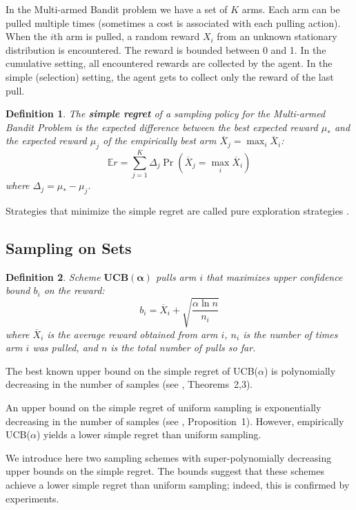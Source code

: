 \documentclass[letterpaper]{article}
\newcommand {\IE} {\ensuremath {\mathbb{E}}}
\newtheorem{dfn}{Definition}
\begin{document}
In the Multi-armed Bandit problem \cite{Vermorel.bandits} we have a set
of $K$ arms. Each arm can be pulled multiple times (sometimes a cost is
associated with each pulling action). When the $i$th arm
is pulled, a random reward $X_i$ from an unknown stationary
distribution is encountered.  The reward is bounded between 0 and 1.
In the cumulative setting, all encountered rewards are collected
by the agent. In the simple (selection) setting, the agent gets to
collect only the reward of the last pull.

\begin{dfn}
The \textbf{simple regret} of a sampling policy for the Multi-armed Bandit
Problem is the expected difference between the best expected reward
$\mu_*$ and the expected reward $\mu_j$ of the empirically best arm
$\overline X_j=\max_i\overline X_i$:
\begin{equation}
\IE r=\sum_{j=1}^K\Delta_j\Pr(\overline X_j=\max_i\overline X_i)
\label{eqn:simple-regret}
\end{equation}
where $\Delta_j=\mu_*-\mu_j$.
\end{dfn}

Strategies that minimize the simple regret are called pure exploration
strategies \cite{Bubeck.pure}. 

\subsection{Sampling on Sets}
\label{sec:sampling-on-sets}

\begin{dfn} Scheme $\mathbf{UCB(\alpha)}$ pulls arm $i$ that maximizes 
upper confidence bound $b_i$ on the reward:
\begin{equation}
b_i=\overline X_i+\sqrt {\frac {\alpha \ln n} {n_i}}
\label{eqn:ucb}
\end{equation}
where $\overline X_i$ is the average reward obtained from arm $i$,
$n_i$ is the number of times arm $i$ was pulled, and $n$ is the total
number of pulls so far. \end{dfn} The best known upper bound on the simple
regret of UCB($\alpha$) is polynomially decreasing in the number of samples
(see \cite{Bubeck.pure}, Theorems~2,3).

An upper bound on the simple regret of uniform sampling is
exponentially decreasing in the number of samples (see
\cite{Bubeck.pure}, Proposition~1). However, empirically
UCB($\alpha$) yields a lower simple regret than uniform
sampling. 

We introduce here two sampling schemes with super-polynomially
decreasing upper bounds on the simple regret. The bounds
suggest that these schemes achieve a lower simple regret
than uniform sampling; indeed, this is confirmed
by experiments. 
\end{document}

